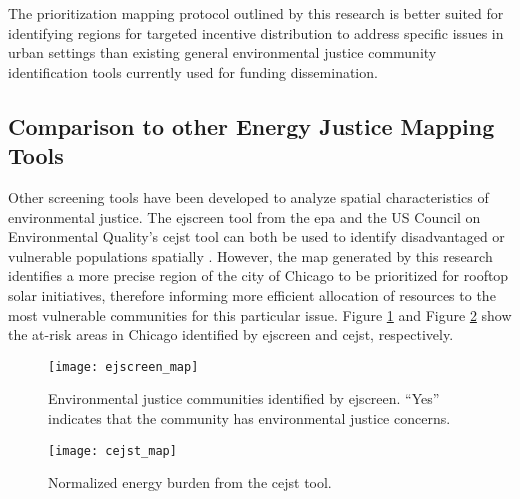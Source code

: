 The prioritization mapping protocol outlined by this research is better suited for
identifying regions for targeted incentive distribution to address specific issues
in urban settings than existing general environmental justice community
identification tools currently used for funding dissemination.

\subsection{Comparison to other Energy Justice Mapping Tools}
Other screening tools have been developed to analyze spatial characteristics of
environmental justice. The \ac{ejscreen} tool from the \ac{epa} \cite{us_epa_ejscreen_2014}
and the US Council on Environmental Quality’s \ac{cejst} tool can both be used to
identify disadvantaged or vulnerable populations spatially
\cite{council_on_environmental_quality_climate_nodate}. However, the map generated
by this research identifies a more precise region of the city of Chicago to be
prioritized for rooftop solar initiatives, therefore informing more efficient
allocation of resources to the most vulnerable communities for this particular issue.
Figure \ref{fig:ejscreen_map} and Figure \ref{fig:cejst_map} show the at-risk areas
in Chicago identified by \ac{ejscreen} and \ac{cejst}, respectively.
\begin{figure}[H]
    \begin{center}
      \texttt{[image: ejscreen\_map]}
      \caption{Environmental justice communities identified by \ac{ejscreen}. ``Yes''
      indicates that the community has environmental justice concerns.}
      \label{fig:ejscreen_map}
    \end{center}
\end{figure}

\begin{figure}[H]
    \begin{center}
      \texttt{[image: cejst\_map]}
      \caption{Normalized energy burden from the \ac{cejst} tool.}
      \label{fig:cejst_map}
    \end{center}
\end{figure}

